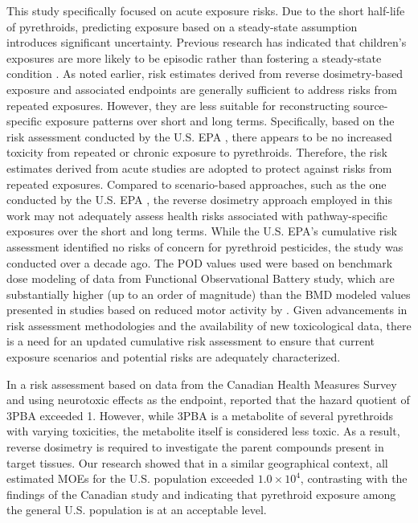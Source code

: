 \documentclass[toxics,article,submit,pdftex,moreauthors]{Definitions/mdpi}
\begin{document}
This study specifically focused on acute exposure risks. Due to the short
half-life of pyrethroids, predicting exposure based on a steady-state
assumption introduces significant uncertainty. Previous research has indicated
that children's exposures are more likely to be episodic rather than fostering
a steady-state condition \citep{kissel_comparison_2005}. As noted earlier, risk
estimates derived from reverse dosimetry-based exposure and associated
endpoints are generally sufficient to address risks from repeated exposures.
However, they are less suitable for reconstructing source-specific exposure
patterns over short and long terms. Specifically, based on the risk assessment
conducted by the U.S. EPA \citep{us2017cyfluthrin, us2017deltamethrin,
us2017permethrin, us2011pyrethroid, us2018cypermethrin}, there appears to be no
increased toxicity from repeated or chronic exposure to pyrethroids. Therefore,
the risk estimates derived from acute studies are adopted to protect against
risks from repeated exposures. Compared to scenario-based approaches, such as
the one conducted by the U.S. EPA \citep{us2011pyrethroid}, the reverse
dosimetry approach employed in this work may not adequately assess health risks
associated with pathway-specific exposures over the short and long terms. While
the U.S. EPA's cumulative risk assessment identified no risks of concern for
pyrethroid pesticides, the study was conducted over a decade ago. The POD
values used were based on benchmark dose modeling of data from Functional
Observational Battery study, which are substantially higher (up to an order of
magnitude) than the BMD modeled values presented in studies based on reduced
motor activity by \citet{wolansky_relative_2006, wolansky_marcelo_j_evidence_2009}. Given advancements in risk
assessment methodologies and the availability of new toxicological data, there
is a need for an updated cumulative risk assessment to ensure that current
exposure scenarios and potential risks are adequately characterized.

In a risk assessment based on data from the Canadian Health Measures
Survey and using neurotoxic effects as the endpoint,
\citet{faure_evaluation_2020} reported that the hazard quotient of 3PBA
exceeded 1. However, while 3PBA is a metabolite of several pyrethroids
with varying toxicities, the metabolite itself is considered less toxic.
As a result, reverse dosimetry is required to investigate the parent
compounds present in target tissues. Our research showed that in a
similar geographical context, all estimated MOEs for the U.S. population
exceeded \(1.0 \times 10^{4}\), contrasting with the findings of the
Canadian study and indicating that pyrethroid exposure among the general
U.S. population is at an acceptable level.
\end{document}
